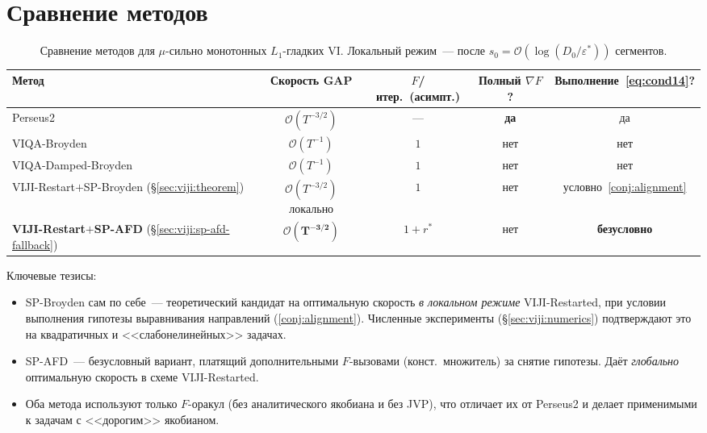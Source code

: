 \section{Сравнение методов}
\label{sec:viji:comparison}

\begin{table}[h]
\centering
\small
\begin{tabularx}{\textwidth}{@{}>{\raggedright\arraybackslash}Xcccc@{}}
\toprule
Метод & Скорость GAP & $F$/итер.\ (асимпт.) & Полный $\nabla F$? & Выполнение~\eqref{eq:cond14}? \\
\midrule
Perseus2~\cite{Lin2022Perseus}              & $\mathcal O(T^{-3/2})$ & ---           & \textbf{да} & да \\
VIQA-Broyden~\cite{Agafonov2024VIJI}        & $\mathcal O(T^{-1})$   & $1$           & нет         & нет \\
VIQA-Damped-Broyden~\cite{Agafonov2024VIJI} & $\mathcal O(T^{-1})$   & $1$           & нет         & нет \\
\midrule
VIJI-Restart${+}$SP-Broyden (\S\ref{sec:viji:theorem}) &
  $\mathcal O(T^{-3/2})$ локально                          & $1$           & нет         & условно~\ref{conj:alignment} \\
\textbf{VIJI-Restart${+}$SP-AFD} (\S\ref{sec:viji:sp-afd-fallback}) &
  $\mathbf{\mathcal O(T^{-3/2})}$                            & $1 + r^{*}$   & нет         & \textbf{безусловно} \\
\bottomrule
\end{tabularx}
\caption{Сравнение методов для $\mu$-сильно монотонных $L_1$-гладких VI.
Локальный режим~--- после $s_0 = \mathcal O(\log(D_0/\varepsilon^{*}))$ сегментов.}
\label{tab:compare}
\end{table}

Ключевые тезисы:
\begin{itemize}
\item SP-Broyden сам по себе~--- теоретический кандидат на оптимальную
      скорость \emph{в локальном режиме} VIJI-Restarted, при условии
      выполнения гипотезы выравнивания направлений (\ref{conj:alignment}).
      Численные эксперименты (\S\ref{sec:viji:numerics}) подтверждают это
      на квадратичных и <<слабонелинейных>> задачах.
\item SP-AFD~--- безусловный вариант, платящий дополнительными $F$-вызовами
      (конст.\ множитель) за снятие гипотезы. Даёт \emph{глобально} оптимальную
      скорость в схеме VIJI-Restarted.
\item Оба метода используют только $F$-оракул (без аналитического якобиана
      и без JVP), что отличает их от Perseus2 и делает применимыми к
      задачам с <<дорогим>> якобианом.
\end{itemize}

